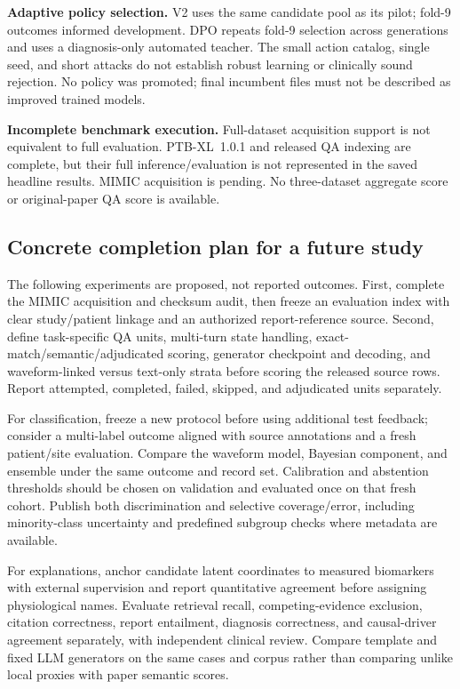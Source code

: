 \textbf{Adaptive policy selection.} V2 uses the same candidate pool as its pilot; fold-9 outcomes informed development. DPO repeats fold-9 selection across generations and uses a diagnosis-only automated teacher. The small action catalog, single seed, and short attacks do not establish robust learning or clinically sound rejection. No policy was promoted; final incumbent files must not be described as improved trained models.\par

\textbf{Incomplete benchmark execution.} Full-dataset acquisition support is not equivalent to full evaluation. PTB-XL~1.0.1 and released QA indexing are complete, but their full inference/evaluation is not represented in the saved headline results. MIMIC acquisition is pending. No three-dataset aggregate score or original-paper QA score is available.

\subsection{Concrete completion plan for a future study}
The following experiments are proposed, not reported outcomes. First, complete the MIMIC acquisition and checksum audit, then freeze an evaluation index with clear study/patient linkage and an authorized report-reference source. Second, define task-specific QA units, multi-turn state handling, exact-match/semantic/adjudicated scoring, generator checkpoint and decoding, and waveform-linked versus text-only strata before scoring the released source rows. Report attempted, completed, failed, skipped, and adjudicated units separately.

For classification, freeze a new protocol before using additional test feedback; consider a multi-label outcome aligned with source annotations and a fresh patient/site evaluation. Compare the waveform model, Bayesian component, and ensemble under the same outcome and record set. Calibration and abstention thresholds should be chosen on validation and evaluated once on that fresh cohort. Publish both discrimination and selective coverage/error, including minority-class uncertainty and predefined subgroup checks where metadata are available.

For explanations, anchor candidate latent coordinates to measured biomarkers with external supervision and report quantitative agreement before assigning physiological names. Evaluate retrieval recall, competing-evidence exclusion, citation correctness, report entailment, diagnosis correctness, and causal-driver agreement separately, with independent clinical review. Compare template and fixed LLM generators on the same cases and corpus rather than comparing unlike local proxies with paper semantic scores.

